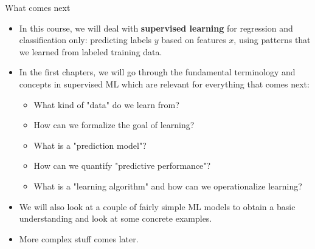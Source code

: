 \documentclass[11pt,compress,t,notes=noshow, xcolor=table]{beamer}
\begin{document}
\begin{frame}{What comes next}

\begin{itemize}

\item In this course, we will deal with \textbf{supervised learning} for regression 
and classification only: predicting labels $y$ based on features $x$, using 
patterns that we learned from labeled training data.
  
  \item In the first chapters, we will go through the fundamental terminology 
  and concepts in supervised ML which are relevant for everything that comes 
  next:
  
  \begin{itemize}
  
    \item What kind of "data" do we learn from?
    \item How can we formalize the goal of learning?
    \item What is a "prediction model"?
    \item How can we quantify "predictive performance"?
    \item What is a "learning algorithm" and how can we operationalize learning?
  
  \end{itemize}
  
  \item We will also look at a couple of fairly simple ML models to obtain a
  basic understanding and look at some concrete examples.
  
  \item More complex stuff comes later.
  
\end{itemize}

\end{frame}



\endlecture
\end{document}
